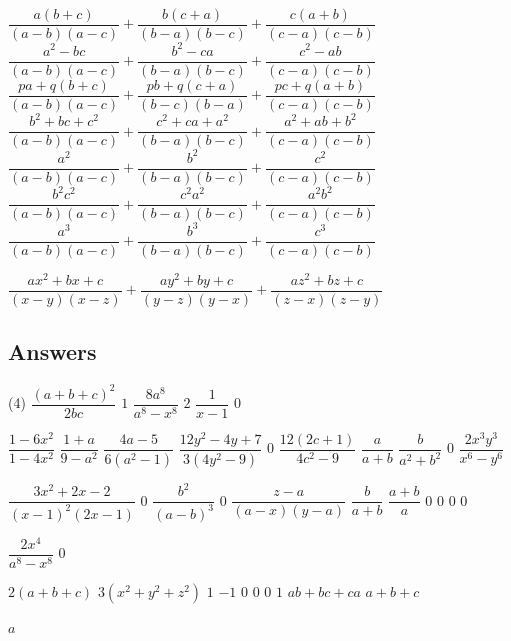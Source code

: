 \begin{tasks}[label = \arabic*.,label-width = 1.5em]
			\task* $\dfrac{a(b+c)}{(a-b)(a-c)}+\dfrac{b(c+a)}{(b-a)(b-c)}+\dfrac{c(a+b)}{(c-a)(c-b)}$
			\task* $\dfrac{a^2-bc}{(a-b)(a-c)}+\dfrac{b^2-ca}{(b-a)(b-c)}+\dfrac{c^2-ab}{(c-a)(c-b)}$
			\task* $\dfrac{pa+q(b+c)}{(a-b)(a-c)}+\dfrac{pb+q(c+a)}{(b-c)(b-a)}+\dfrac{pc+q(a+b)}{(c-a)(c-b)}$
			\task* $\dfrac{b^2+bc+c^2}{(a-b)(a-c)}+\dfrac{c^2+ca+a^2}{(b-a)(b-c)}+\dfrac{a^2+ab+b^2}{(c-a)(c-b)}$
			\task* $\dfrac{a^2}{(a-b)(a-c)}+\dfrac{b^2}{(b-a)(b-c)}+\dfrac{c^2}{(c-a)(c-b)}$
			\task* $\dfrac{b^2c^2}{(a-b)(a-c)}+\dfrac{c^2a^2}{(b-a)(b-c)}+\dfrac{a^2b^2}{(c-a)(c-b)}$
			\task* $\dfrac{a^3}{(a-b)(a-c)}+\dfrac{b^3}{(b-a)(b-c)}+\dfrac{c^3}{(c-a)(c-b)}$ 
			
			
			\task* $\dfrac{ax^2+bx+c}{(x-y)(x-z)}+\dfrac{ay^2+by+c}{(y-z)(y-x)}+\dfrac{az^2+bz+c}{(z-x)(z-y)}$

		\end{tasks}
		\subsection*{Answers}
		\begin{tasks}[label = \arabic*.,label-width = 1.5em](4)
			\task $\dfrac{(a+b+c)^2}{2bc}$
			\task $1$
			\task $\dfrac{8a^8}{a^8-x^8}$
			\task $2$
			\task $\dfrac{1}{x-1}$
			\task $0$

			\task $\dfrac{1-6x^2}{1-4x^2}$
			\task $\dfrac{1+a}{9-a^2}$
			\task $\dfrac{4a-5}{6(a^2-1)}$
			\task $\dfrac{12y^2-4y+7}{3(4y^2-9)}$
			\task $0$
			\task $\dfrac{12(2c+1)}{4c^2-9}$
			\task $\dfrac{a}{a+b}$
			\task $\dfrac{b}{a^2+b^2}$
			\task $0$
			\task $\dfrac{2x^3y^3}{x^6-y^6}$

			\task $\dfrac{3x^2+2x-2}{(x-1)^2(2x-1)}$
			\task $0$
			\task $\dfrac{b^2}{(a-b)^3}$
			\task $0$
			\task $\dfrac{z-a}{(a-x)(y-a)}$
			\task $\dfrac{b}{a+b}$
			\task $\dfrac{a+b}{a}$
			\task $0$
			\task $0$
			\task $0$
			\task $0$
			
			\task $\dfrac{2x^4}{a^8-x^8}$
			\task $0$

			\task $2(a+b+c)$
			\task $3(x^2+y^2+z^2)$
			\task $1$
			\task $-1$
			\task $0$
			\task $0$
			\task $0$
			\task $1$
			\task $ab+bc+ca$
			\task $a+b+c$



			\task $a$


		\end{tasks}